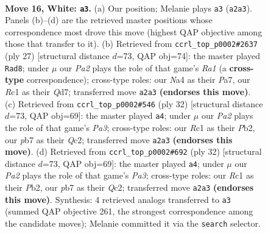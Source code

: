 \documentclass[11pt]{article}
\begin{document}
\clearpage

\begin{figure}[p]\centering
\begin{subfigure}{0.46\textwidth}\centering
\resizebox{\linewidth}{!}{%
\newchessgame
\chessboard[
  setfen={rnq1r1k1/pp1bbppp/4pn2/2Pp4/N2P4/5N2/PP1B1PPP/1BRQR1K1 w - - 17 16},
  showmover=false,
  pgfstyle=straightmove, color=movearrow, markmove={a2-a3}
]}
\caption{}
\end{subfigure}\hfill
\begin{subfigure}{0.46\textwidth}\centering
\resizebox{\linewidth}{!}{%
\newchessgame
\chessboard[
  setfen={r3r1k1/pp1qbppp/2n2n2/3p1b2/8/P1N1BNP1/1P1QPPBP/R2R2K1 b - - 2 14},
  showmover=false,
  pgfstyle=straightmove, color=movearrow, markmove={a8-d8}
]}
\caption{}
\end{subfigure}
\\[4pt]
\begin{subfigure}{0.46\textwidth}\centering
\resizebox{\linewidth}{!}{%
\newchessgame
\chessboard[
  setfen={2r1r1k1/p2nbpp1/1qb2n1p/2pp4/7B/P1N1PN2/1PQRBPPP/3R2K1 w - - 8 17},
  showmover=false,
  pgfstyle=straightmove, color=movearrow, markmove={a3-a4}
]}
\caption{}
\end{subfigure}\hfill
\begin{subfigure}{0.46\textwidth}\centering
\resizebox{\linewidth}{!}{%
\newchessgame
\chessboard[
  setfen={2r1r1k1/p2nbpp1/1qb2n1p/2pp4/7B/P1N1PN2/1PQRBPPP/3R2K1 w - - 8 17},
  showmover=false,
  pgfstyle=straightmove, color=movearrow, markmove={a3-a4}
]}
\caption{}
\end{subfigure}
\caption{\textbf{Move 16, White: \texttt{a3}.} (a) Our position; Melanie plays \texttt{a3} (\texttt{a2a3}). Panels (b)--(d) are the retrieved master positions whose correspondence most drove this move (highest QAP objective among those that transfer to it). (b) Retrieved from \texttt{ccrl\_top\_p0002\#2637} (ply 27) [structural distance $d$=73, QAP obj=74]: the master played \texttt{Rad8}; under $\mu$ our \emph{Pa2} plays the role of that game's \emph{Ra1} (a \textbf{cross-type} correspondence); cross-type roles: our \emph{N}a4 as their \emph{P}a7, our \emph{R}c1 as their \emph{Q}d7; transferred move \texttt{a2a3} \textbf{(endorses this move)}. (c) Retrieved from \texttt{ccrl\_top\_p0002\#546} (ply 32) [structural distance $d$=73, QAP obj=69]: the master played \texttt{a4}; under $\mu$ our \emph{Pa2} plays the role of that game's \emph{Pa3}; cross-type roles: our \emph{R}c1 as their \emph{P}b2, our \emph{p}b7 as their \emph{Q}c2; transferred move \texttt{a2a3} \textbf{(endorses this move)}. (d) Retrieved from \texttt{ccrl\_top\_p0002\#692} (ply 32) [structural distance $d$=73, QAP obj=69]: the master played \texttt{a4}; under $\mu$ our \emph{Pa2} plays the role of that game's \emph{Pa3}; cross-type roles: our \emph{R}c1 as their \emph{P}b2, our \emph{p}b7 as their \emph{Q}c2; transferred move \texttt{a2a3} \textbf{(endorses this move)}. Synthesis: 4 retrieved analogs transferred to \texttt{a3} (summed QAP objective 261, the strongest correspondence among the candidate moves); Melanie committed it via the \texttt{search} selector.}
\label{fig:thought-m30}
\end{figure}
\end{document}
